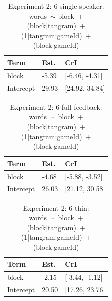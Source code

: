 \documentclass[
  english,
  a4paper,
]{article}
\begin{document}
\begin{table}[h!]

\caption{\label{tab:unnamed-chunk-11}Experiment 2: 6 single speaker:\\ words~$\sim$ block~+ (block|tangram)~+ (1|tangram:gameId)~+ (block|gameId)}
\centering
\begin{tabular}[t]{lll}
\toprule
Term & Est. & CrI\\
\midrule
block & -5.39 & {}[-6.46, -4.31]\\
Intercept & 29.93 & {}[24.92, 34.84]\\
\bottomrule
\end{tabular}
\end{table}

\begin{table}[h!]

\caption{\label{tab:unnamed-chunk-11}Experiment 2: 6 full feedback:\\ words~$\sim$ block~+ (block|tangram)~+ (1|tangram:gameId)~+ (block|gameId)}
\centering
\begin{tabular}[t]{lll}
\toprule
Term & Est. & CrI\\
\midrule
block & -4.68 & {}[-5.88, -3.52]\\
Intercept & 26.03 & {}[21.12, 30.58]\\
\bottomrule
\end{tabular}
\end{table}

\begin{table}[h!]

\caption{\label{tab:unnamed-chunk-11}Experiment 2: 6 thin:\\ words~$\sim$ block~+ (block|tangram)~+ (1|tangram:gameId)~+ (block|gameId)}
\centering
\begin{tabular}[t]{lll}
\toprule
Term & Est. & CrI\\
\midrule
block & -2.15 & {}[-3.44, -1.12]\\
Intercept & 20.50 & {}[17.26, 23.76]\\
\bottomrule
\end{tabular}
\end{table}
\end{document}
